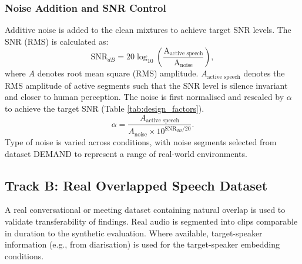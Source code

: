 \subsubsection{Noise Addition and SNR Control}
Additive noise is added to the clean mixtures to achieve target SNR levels. The SNR (RMS) is calculated as:
\begin{equation}
\mathrm{SNR}_{dB} = 20 \log_{10}\left(\frac{\text{A}_\text{active speech}}{\text{A}_\text{noise}}\right),
\end{equation}
where $A$ denotes root mean square (RMS) amplitude. $A_\text{active speech}$ denotes the RMS amplitude of active segments such that the SNR level is silence invariant and closer to human perception. The noise is first normalised and rescaled by $\alpha$ to achieve the target SNR (Table \ref{tab:design_factors}).
\begin{equation}
\alpha = \frac{A_\text{active speech}}{A_\text{noise} \times 10^{\mathrm{SNR}_{dB}/20}}.
\end{equation}
Type of noise is varied across conditions, with noise segments selected from dataset DEMAND to represent a range of real-world environments.

\subsection{Track B: Real Overlapped Speech Dataset}
A real conversational or meeting dataset containing natural overlap is used to validate transferability of findings. Real audio is segmented into clips comparable in duration to the synthetic evaluation. Where available, target-speaker information (e.g., from diarisation) is used for the target-speaker embedding conditions.
